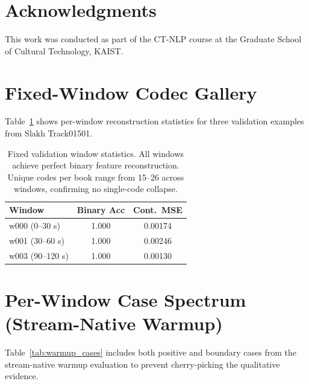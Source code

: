 \documentclass[11pt]{article}
\begin{document}
\section*{Acknowledgments}

This work was conducted as part of the CT-NLP course at the Graduate School of
Cultural Technology, KAIST.



\appendix

\section{Fixed-Window Codec Gallery}
\label{app:codec}

Table~\ref{tab:codec_gallery} shows per-window reconstruction statistics for three
validation examples from Slakh Track01501.

\begin{table}[h]
\centering
\small
\begin{tabular}{lcc}
\toprule
Window & Binary Acc & Cont.\ MSE \\
\midrule
w000 (0--30 s)   & 1.000 & 0.00174 \\
w001 (30--60 s)  & 1.000 & 0.00246 \\
w003 (90--120 s) & 1.000 & 0.00130 \\
\bottomrule
\end{tabular}
\caption{Fixed validation window statistics.  All windows achieve perfect binary
  feature reconstruction.  Unique codes per book range from 15--26 across windows,
  confirming no single-code collapse.}
\label{tab:codec_gallery}
\end{table}

\section{Per-Window Case Spectrum (Stream-Native Warmup)}
\label{app:warmup}

Table~\ref{tab:warmup_cases} includes both positive and boundary cases from the
stream-native warmup evaluation to prevent cherry-picking the qualitative evidence.
\end{document}
